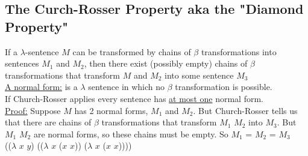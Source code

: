\documentclass{article}
\begin{document}
\begin{flushleft}
\begin{flushleft}
  \section*{The Curch-Rosser Property aka the "Diamond Property"}
  If a $\lambda$-sentence $\mathit{M}$ can be transformed by chains of $\beta$ transformations into sentences $\mathit{M_1}$ and $\mathit{M_2}$, then there exist (possibly empty) chains of $\beta$ transformations that transform $\mathit{M}$ and $\mathit{M_2}$ into some sentence $\mathit{M_3}$\\
  \bigskip
  \underline{A normal form:} is a $\lambda$ sentence in which no $\beta$ transformation is possible.\\
  If Church-Rosser applies every sentence has \underline{at most one} normal form. \\
  \underline{Proof:} Suppose $\mathit{M}$ has 2 normal forms, $\mathit{M_1}$ and $\mathit{M_2}$. But Church-Rosser tells us that there are chains of $\beta$ transformations that transform $\mathit{M_1}$ $\mathit{M_2}$ into $\mathit{M_3}$. But $\mathit{M_1}$ $\mathit{M_2}$ are normal forms, so these chains must be empty. So $\mathit{M_1}$ =  $\mathit{M_2}$ = $\mathit{M_3}$\\
  \bigskip
  (($\lambda$ $\mathit{x}$ $\mathit{y}$) (($\lambda$ $\mathit{x}$ ($\mathit{x}$ $\mathit{x}$)) ($\lambda$ $\mathit{x}$ ($\mathit{x}$ $\mathit{x}$))))\\
 \end{flushleft}
\end{flushleft}
\end{document}
